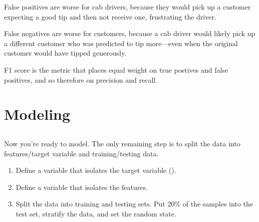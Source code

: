 \documentclass[letterpaper,10pt,english]{sphinxmanual}
\begin{document}
\sphinxAtStartPar
False positives are worse for cab drivers, because they would pick up a customer expecting a good tip and then not receive one, frustrating the driver.

\sphinxAtStartPar
False negatives are worse for customers, because a cab driver would likely pick up a different customer who was predicted to tip more—even when the original customer would have tipped generously.

\sphinxAtStartPar
{}

\sphinxAtStartPar
F1 score is the metric that places equal weight on true postives and false positives, and so therefore on precision and recall.


\section{Modeling}
\label{\detokenize{Automatidata_Machine Learning:modeling}}

\subsection{}
\label{\detokenize{Automatidata_Machine Learning:split-the-data}}
\sphinxAtStartPar
Now you’re ready to model. The only remaining step is to split the data into features/target variable and training/testing data.
\begin{enumerate}
%
\item {} 
\sphinxAtStartPar
Define a variable  that isolates the target variable ().

\item {} 
\sphinxAtStartPar
Define a variable  that isolates the features.

\item {} 
\sphinxAtStartPar
Split the data into training and testing sets. Put 20\% of the samples into the test set, stratify the data, and set the random state.

\end{enumerate}
\end{document}
